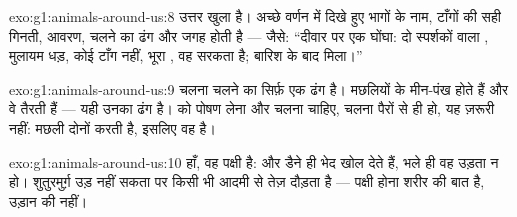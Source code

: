 \begin{solution}{exo:g1:animals-around-us:8}
उत्तर खुला है। अच्छे वर्णन में दिखे हुए भागों के नाम, टाँगों की सही
गिनती, आवरण, चलने का ढंग और जगह होती है --- जैसे: ``दीवार पर एक
घोंघा: दो स्पर्शकों वाला , मुलायम धड़, कोई टाँग नहीं, भूरा ,
वह सरकता है; बारिश के बाद मिला।''
\end{solution}

\begin{solution}{exo:g1:animals-around-us:9}
चलना चलने का सिर्फ़ एक ढंग है। मछलियों के मीन-पंख होते हैं और वे
तैरती हैं --- यही उनका ढंग है।  को पोषण लेना और चलना चाहिए, चलना
पैरों से ही हो, यह ज़रूरी नहीं: मछली दोनों करती है, इसलिए वह 
है।
\end{solution}

\begin{solution}{exo:g1:animals-around-us:10}
हाँ, वह पक्षी है:  और डैने ही भेद खोल देते हैं, भले ही वह उड़ता
न हो। शुतुरमुर्ग़ उड़ नहीं सकता पर किसी भी आदमी से तेज़ दौड़ता है ---
पक्षी होना शरीर की बात है, उड़ान की नहीं।
\end{solution}
